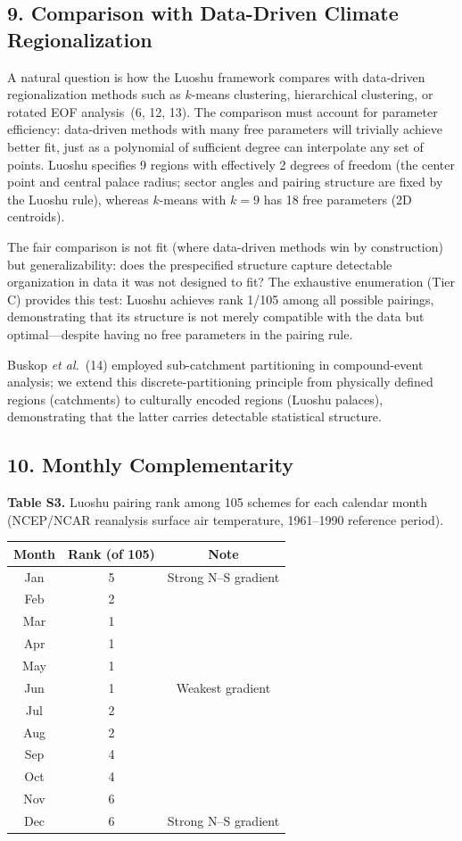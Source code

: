 \documentclass[10pt]{article}
\begin{document}
\subsection*{9. Comparison with Data-Driven Climate Regionalization}

A natural question is how the Luoshu framework compares with data-driven regionalization methods such as $k$-means clustering, hierarchical clustering, or rotated EOF analysis~(6, 12, 13). The comparison must account for parameter efficiency: data-driven methods with many free parameters will trivially achieve better fit, just as a polynomial of sufficient degree can interpolate any set of points. Luoshu specifies 9 regions with effectively 2 degrees of freedom (the center point and central palace radius; sector angles and pairing structure are fixed by the Luoshu rule), whereas $k$-means with $k = 9$ has 18 free parameters (2D centroids).

The fair comparison is not fit (where data-driven methods win by construction) but generalizability: does the prespecified structure capture detectable organization in data it was not designed to fit? The exhaustive enumeration (Tier C) provides this test: Luoshu achieves rank 1/105 among all possible pairings, demonstrating that its structure is not merely compatible with the data but optimal---despite having no free parameters in the pairing rule.

Buskop \textit{et al.}~(14) employed sub-catchment partitioning in compound-event analysis; we extend this discrete-partitioning principle from physically defined regions (catchments) to culturally encoded regions (Luoshu palaces), demonstrating that the latter carries detectable statistical structure.

\subsection*{10. Monthly Complementarity}

\textbf{Table S3.} Luoshu pairing rank among 105 schemes for each calendar month (NCEP/NCAR reanalysis surface air temperature, 1961--1990 reference period).

\vspace{6pt}

\begin{tabular}{ccc}
\toprule
Month & Rank (of 105) & Note \\
\midrule
Jan & 5 & Strong N--S gradient \\
Feb & 2 & \\
Mar & 1 & \\
Apr & 1 & \\
May & 1 & \\
Jun & 1 & Weakest gradient \\
Jul & 2 & \\
Aug & 2 & \\
Sep & 4 & \\
Oct & 4 & \\
Nov & 6 & \\
Dec & 6 & Strong N--S gradient \\
\bottomrule
\end{tabular}
\end{document}

